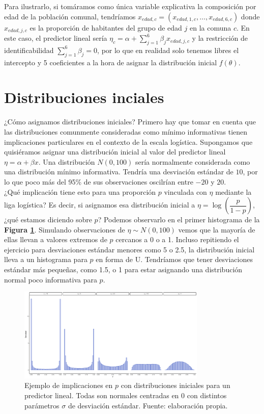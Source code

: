 Para ilustrarlo, si tomáramos como única variable explicativa la composición por edad de la población comunal, tendríamos $x_{edad,c}=(x_{edad,1,c}, \dots, x_{edad,6,c})$ donde $x_{edad,j,c}$ es la proporción de habitantes del grupo de edad $j$ en la comuna $c$. En este caso, el predictor lineal sería $\eta_c = \alpha + \sum\limits_{j=1}^6 \beta_j x_{edad,j,c}$ y la restricción de identificabilidad $\sum\limits_{j=1}^{6}\beta_j=0$, por lo que en realidad solo tenemos libres el intercepto y 5 coeficientes a la hora de asignar la distribución inicial $f(\theta)$. 

\section{Distribuciones inciales} \label{Secc_Iniciales}

¿Cómo asignamos distribuciones iniciales? Primero hay que tomar en cuenta que las distribuciones comunmente consideradas como mínimo informativas tienen implicaciones particulares en el contexto de la escala logística. Supongamos que quisiéramos asignar una distribución inicial al valor del predictor lineal $\eta = \alpha + \beta x$. Una distribución $N(0,100)$ sería normalmente considerada como una distribución mínimo informativa. Tendría una desviación estándar de $10$, por lo que poco más del 95\% de sus observaciones oscilrían entre $-20$ y $20$.\\ 

¿Qué implicación tiene esto para una proporción $p$ vinculada con $\eta$ mediante la liga logística? Es decir, si asignamos esa distribución inicial a $\eta=\log\left(\dfrac{p}{1-p}\right)$, ¿qué estamos diciendo sobre $p$? Podemos observarlo en el primer histograma de la \textbf{Figura \ref{fig:Malas_Iniciales}}. Simulando observaciones de $\eta\sim N(0,100)$ vemos que la mayoría de ellas llevan a valores extremos de $p$ cercanos a 0 o a 1. Incluso repitiendo el ejercicio para desviaciones estándar menores como 5 o 2.5, la distribución inicial lleva a un histograma para $p$ en forma de U. Tendríamos que tener desviaciones estándar más pequeñas, como 1.5, o 1 para estar asignando una distribución normal poco informativa para $p$.\\ 

\begin{figure}[h]
	\centering
	\includegraphics[width = 0.8\textwidth]{Figs/Modelado/Malas_Iniciales}
	\caption{Ejemplo de implicaciones en $p$ con distribuciones iniciales para un predictor lineal. Todas son normales centradas en $0$ con distintos parámetros $\sigma$ de desviación estándar. Fuente: elaboración propia.}
	\label{fig:Malas_Iniciales}
\end{figure}


